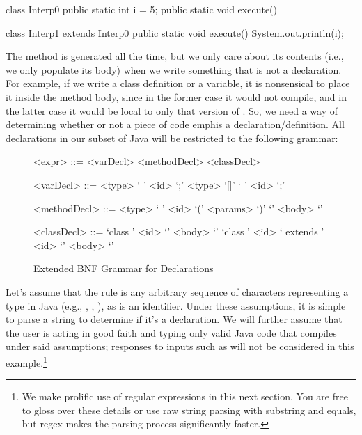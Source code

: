 \begin{verbnobox}[\small]
class Interp0 {
  public static int i = 5;
  public static void execute() {}
}

class Interp1 extends Interp0 {
  public static void execute() {
    System.out.println(i);  
  }
}
\end{verbnobox}

The  method is generated all the time, but we only care about its contents (i.e., we only populate its body) when we write something that is not a declaration. For example, if we write a class definition or a variable, it is nonsensical to place it inside the  method body, since in the former case it would not compile, and in the latter case it would be local to only that version of . So, we need a way of determining whether or not a piece of code emph{is} a declaration/definition. All declarations in our subset of Java will be restricted to the following grammar:

\setlength{\grammarparsep}{20pt plus 1pt minus 1pt} %
\setlength{\grammarindent}{12em} %
\begin{figure}[H]
        \begin{grammar}
            <expr> ::= <varDecl> 
                    \alt <methodDecl> 
                    \alt <classDecl>

            <varDecl> ::= <type> ` ' <id> `;'
                      \alt <type> `[]' ` ' <id> `;'

            <methodDecl> ::= <type> ` ' <id> `(' <params> `)' `{' <body> `}'

            <classDecl> ::= `class ' <id> `{' <body> `}'
                        \alt `class ' <id> ` extends ' <id> `{' <body> `}'

        \end{grammar}
    \caption{ Extended BNF Grammar for Declarations }
\end{figure}

Let's assume that the  rule is any arbitrary sequence of characters representing a type in Java (e.g., , , ), as is an identifier. Under these assumptions, it is simple to parse a string to determine if it's a declaration. We will further assume that the user is acting in good faith and typing only valid Java code that compiles under said assumptions; responses to inputs such as  will not be considered in this example.\footnote{We make prolific use of regular expressions in this next section. You are free to gloss over these details or use raw string parsing with substring and equals, but regex makes the parsing process significantly faster.}

